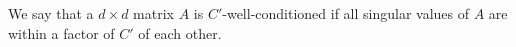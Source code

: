 













We say that a $d \times d$ matrix $A$ is $C'$-well-conditioned if all singular values of $A$ are within a factor of $C'$ of each other.

